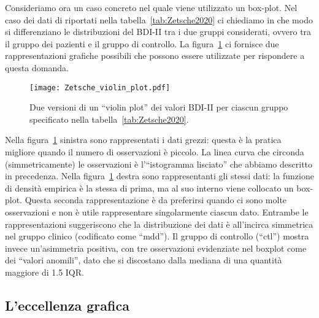 Consideriamo ora un caso concreto nel quale viene utilizzato un box-plot.
Nel caso dei dati di \citet{zetsche_future_2019} riportati nella tabella~\ref{tab:Zetsche2020} ci chiediamo in che modo si differenziano le distribuzioni del BDI-II tra i due gruppi considerati, ovvero tra il gruppo dei pazienti e il gruppo di controllo.
La figura~\ref{fig:Zetsche_violin_plot} ci fornisce due rappresentazioni grafiche possibili che possono essere utilizzate per rispondere a questa domanda.  

\begin{figure}
\centering
\texttt{[image: Zetsche\_violin\_plot.pdf]}
\caption{Due versioni di un ``violin plot'' dei valori BDI-II per ciascun gruppo specificato nella tabella~\ref{tab:Zetsche2020}.}
\label{fig:Zetsche_violin_plot}
\end{figure}

Nella figura~\ref{fig:Zetsche_violin_plot} sinistra sono rappresentati i dati grezzi: questa è la pratica migliore quando il numero di osservazioni è piccolo. 
La linea curva che circonda (simmetricamente) le osservazioni è l'``istogramma lisciato'' che abbiamo descritto in precedenza.
Nella figura~\ref{fig:Zetsche_violin_plot} destra sono rappresentanti gli stessi dati: la funzione di densità empirica è la stessa di prima, ma al suo interno viene collocato un box-plot.
Questa seconda rappresentazione è da preferirsi quando ci sono molte osservazioni e non è utile rappresentare singolarmente ciascun dato.
Entrambe le rappresentazioni suggeriscono che la distribuzione dei dati è all'incirca simmetrica nel gruppo clinico (codificato come ``mdd'').
Il gruppo di controllo (``ctl'') mostra invece un'asimmetria positiva, con tre osservazioni evidenziate nel boxplot come dei ``valori anomili'', dato che si discostano dalla mediana di una quantità maggiore di 1.5 IQR.


\subsection{L'eccellenza grafica}

